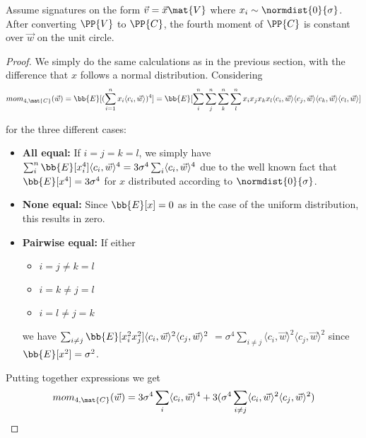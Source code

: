\begin{lemma}[Lemma 1]
\label{hpp_norm_lemma}
Assume signatures on the form $\vec{v} = \vec{x} \mat{V}$ where $x_i \sim \normdist{0}{\sigma}$. After converting $\PP{V}$ to $\PP{C}$, 
the fourth moment of $\PP{C}$ is constant over $\vec{w}$ on the unit circle.
\end{lemma}
\begin{proof}
    We simply do the same calculations as in the previous section, with the difference that $x$ follows a normal distribution.
    Considering
    \[ mom_{4, \mat{C}}(\vec{w}) = \bb{E}[(\sum_{i=1}^{n} x_i \langle c_i, \vec{w} \rangle ) ^4] = 
        \bb{E}[\sum_{i}^{n} \sum_{j}^{n} \sum_{k}^{n} \sum_{l}^{n} x_i x_j x_k x_l 
        \langle c_i, \vec{w} \rangle \langle c_j, \vec{w} \rangle
    \langle c_k, \vec{w} \rangle \langle c_l, \vec{w} \rangle] \]

    for the three different cases:
    \begin{itemize}
        \item \textbf{All equal: } If $i = j = k = l$, we simply have $\sum_i^n \bb{E}[x_i^4] \langle c_i, \vec{w} \rangle ^4 = 3 \sigma ^4 \sum_i \langle c_i, \vec{w} \rangle ^4$
            due to the well known fact that $\bb{E}[x^4] = 3 \sigma ^4$ for $x$ distributed according to $\normdist{0}{\sigma}$.
        \item \textbf{None equal:} Since $\bb{E}[x] = 0$ as in the case of the uniform distribution, this results in zero.
        \item \textbf{Pairwise equal:} If either 
            \begin{itemize}
                \item $i = j \neq k = l$
                \item $i = k \neq j = l$ 
                \item $i = l \neq j = k$
            \end{itemize}
            we have $\sum_{i \neq j} \bb{E}[x_i^2 x_j^2] \langle c_i, \vec{w} \rangle ^2 \langle c_j, \vec{w} \rangle ^2$
            $= \sigma^4 \sum_{i \neq j}\langle c_i, \vec{w} \rangle ^2 \langle c_j, \vec{w} \rangle ^2$ since $\bb{E}[x^2] = \sigma^2$.
    \end{itemize}

    Putting together expressions we get 
    \[
        mom_{4, \mat{C}}(\vec{w}) = 3 \sigma ^4 \sum_i \langle c_i, \vec{w} \rangle ^4 + 3(\sigma^4 \sum_{i \neq j}\langle c_i, \vec{w} \rangle ^2 \langle c_j, \vec{w} \rangle ^2)
    \]


\end{proof}
